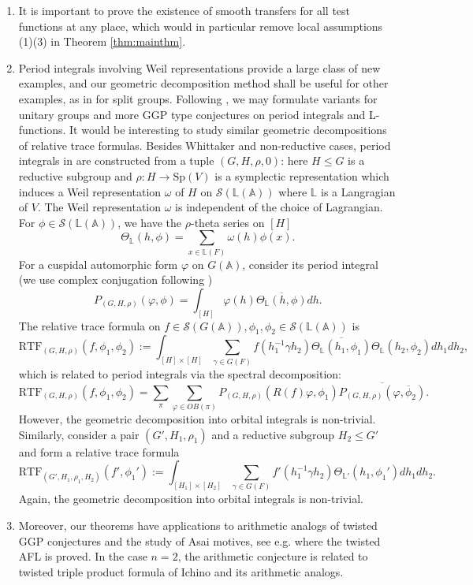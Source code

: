 \documentclass[11pt, reqno]{amsart}
\numberwithin{equation}{subsection}
\theoremstyle{plain}
\theoremstyle{definition}
\newcommand{\BA}{\mathbb A}
\newcommand{\BL}{\mathbb L}
\newcommand{\CS}{\mathcal{S}}
\begin{document}
\begin{enumerate}
    \item It is important to prove the existence of smooth transfers for all test functions at any place, which would in particular remove local assumptions (1)(3) in Theorem \ref{thm:mainthm}.
    \item Period integrals involving Weil representations provide a large class of new examples, and our geometric decomposition method shall be useful for other examples, as in \cite{BZSV, MWZ24} for split groups. Following \cite{MWZ24}, we may formulate variants for unitary groups and more GGP type conjectures on period integrals and L-functions. It would be interesting to study similar geometric decompositions of relative trace formulas. Besides Whittaker and non-reductive cases, period integrals in \cite{BZSV, MWZ24} are constructed from a tuple $(G, H, \rho, 0)$: here $H \leq G$ is a reductive subgroup and $\rho: H \to \mathrm{Sp}(V)$ is a symplectic representation which induces a Weil representation $\omega$ of $H$ on $\CS(\BL(\BA))$ where $\BL$ is a Langragian of $V$. The Weil representation $\omega$ is independent of the choice of Lagrangian.
For $\phi \in\CS(\BL(\BA))$, we have the $\rho$-theta series on $[H]$
\[
\Theta_{\BL}(h, \phi)=\sum_{x \in \BL(F)}  \omega(h)\phi(x).
\]
For a cuspidal automorphic form $\varphi$ on $G(\BA)$, consider its period integral (we use complex conjugation following \cite[Section 2.2]{TwistedGGP})
\[
P_{(G, H, \rho)}(\varphi, \phi)=\int_{[H]} \varphi(h) \overline{\Theta_{\BL}(h, \phi)} dh.
\]
The relative trace formula on $f \in \CS(G(\BA)), \phi_1, \phi_2 \in \CS(\BL(\BA))$ is 
\[
\mathrm{RTF}_{(G, H,\rho)}(f, \phi_1, \phi_2):= \int_{[H] \times [H]} \sum_{\gamma \in G(F)} f(h_1^{-1}\gamma h_2) \overline{\Theta_\BL(h_1, \phi_1)} \Theta_\BL(h_2, \phi_2) dh_1 dh_2,
\]
which is related to period integrals via the spectral decomposition:
\[
\mathrm{RTF}_{(G, H,\rho)}(f, \phi_1, \phi_2)=\sum_{\pi} \sum_{\varphi \in OB(\pi)} P_{(G,H,\rho)}(R(f)\varphi, \phi_1) \overline{P_{(G,H,\rho)}(\varphi, \overline{\phi}_2)}.
\]
However, the geometric decomposition into orbital integrals is non-trivial. Similarly, consider a pair $(G', H_1, \rho_1)$ and a reductive subgroup $H_2 \leq G'$ and form a relative trace formula
\[
\mathrm{RTF}_{(G', H_1, \rho_1, H_2)}(f', \phi_1'):= \int_{[H_1] \times [H_2]} \sum_{\gamma \in G(F)} f'(h_1^{-1}\gamma h_2) \Theta_{\BL'}(h_1, \phi_1') dh_1 dh_2.
\]
Again, the geometric decomposition into orbital integrals is non-trivial. 
    \item 
Moreover, our theorems have applications to arithmetic analogs of twisted GGP conjectures and the study of Asai motives, see e.g. \cite{TAFL} where the twisted AFL is proved. In the case $n=2$, the arithmetic conjecture is related to twisted triple product formula of Ichino and its arithmetic analogs. 
\end{enumerate}
\end{document}
